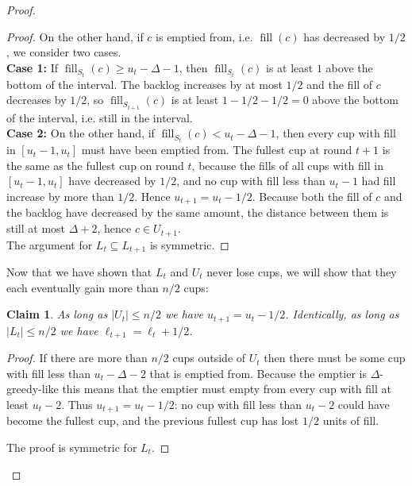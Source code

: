 \documentclass[twocolumn]{article}[10pt]
\DeclareMathOperator{\fil}{\text{fill}}
\newtheorem{clm}{Claim}
\begin{document}
\begin{proof}
\begin{proof}
    On the other hand, if $c$ is emptied from, i.e. $\fil(c)$ has decreased by
    $1/2$, we consider two cases.\\
    \textbf{Case 1:} If $\fil_{S_t}(c) \ge u_t-\Delta -1$, then $\fil_{S_t}(c)$
    is at least $1$ above the bottom of the interval. The backlog increases by
    at most $1/2$ and the fill of $c$ decreases by $1/2$, so
    $\fil_{S_{t+1}}(c)$ is at least $1-1/2-1/2 = 0$ above the bottom of the
    interval, i.e. still in the interval. \\
    \textbf{Case 2:} On the other hand, if $\fil_{S_t}(c) < u_t-\Delta-1$, then every cup
        with fill in $[u_t-1, u_t]$ must have been emptied
        from. The fullest cup at round $t+1$ is the same as the fullest cup on
        round $t$, because the fills of all cups with fill in
        $[u_t-1, u_t]$ have decreased by $1/2$, and no cup with fill less than
        $u_t-1$ had fill increase by more than $1/2$. Hence $u_{t+1} = u_t -1/2$.
        Because both the fill of $c$ and the backlog have decreased by the same
        amount, the distance between them is still at most $\Delta+2$, hence
        $c\in U_{t+1}$.\\
    The argument for $L_t \subseteq L_{t+1}$ is symmetric.
  \end{proof}

  Now that we have shown that $L_t$ and $U_t$ never lose cups, we will show
  that they each eventually gain more than $n/2$ cups:

  \begin{clm}
    \label{clm:smallthenbigger}
    As long as $|U_t| \le n/2$ we have $u_{t+1} = u_t -1/2$. Identically, as
    long as $|L_t| \le n/2$ we have $\ell_{t+1} = \ell_t+ 1/2$.
  \end{clm}
  \begin{proof}
    If there are more than $n/2$ cups outside of $U_t$ then there must be some
    cup with fill less than $u_t-\Delta-2$ that is emptied from. Because the
    emptier is $\Delta$-greedy-like this means that the emptier must empty from
    every cup with fill at least $u_t-2$. Thus $u_{t+1} = u_t -1/2$: no cup
    with fill less than $u_t-2$ could have become the fullest cup, and the
    previous fullest cup has lost $1/2$ units of fill. 

    The proof is symmetric for $L_t$.
  \end{proof}


\end{proof}
\end{document}
